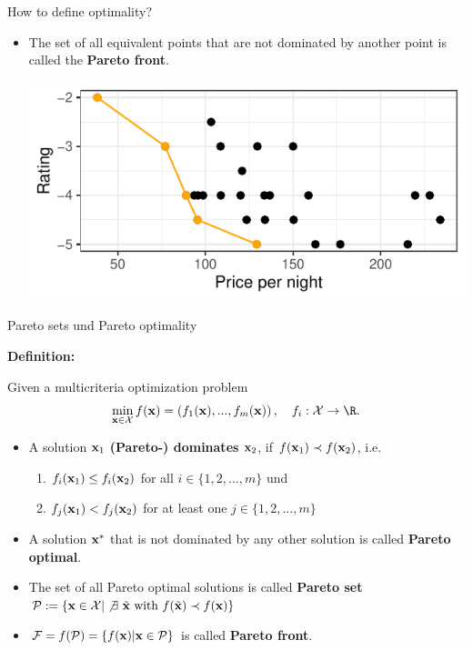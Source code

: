 \begin{frame}[allowframebreaks]{How to define optimality?}
\begin{itemize}
\item The set of all equivalent points that are not dominated by another point is called the \textbf{Pareto front}.

\vspace*{0.3cm}

\centering \includegraphics[width=\maxwidth]{images/expedia-5-1}



\end{itemize}

\end{frame}

\begin{frame}[allowframebreaks]{Pareto sets und Pareto optimality}

\textbf{Definition:}

Given a multicriteria optimization problem $$\min_{\x \in \Xspace} f(\x) = \left(f_1(\x), ..., f_m(\x)\right), \quad f_i: \Xspace \to \R.$$

\begin{itemize}
\item A solution $\mathbf{x}_1$ \textbf{(Pareto-) dominates} $\mathbf{x}_2$, if $f(\mathbf{x}_1) \prec f(\mathbf{x}_2)$, i.e.
\begin{enumerate}
\item $f_i(\mathbf{x}_1) \le f_i(\mathbf{x}_2)$ for all $i \in \{1, 2, ..., m\}$ und
\item $f_j(\mathbf{x}_1) < f_j(\mathbf{x}_2)$ for at least one $j \in \{1, 2, ..., m\}$
\end{enumerate}
\vspace*{0.1cm}
\item A solution $\mathbf{x}^*$ that is not dominated by any other solution is called \textbf{Pareto optimal}.
\vspace*{0.1cm}
\item The set of all Pareto optimal solutions is called \textbf{Pareto set} $\mathcal{P} := \{\mathbf{x} \in \mathcal{X} |\not \exists ~\tilde{\mathbf{x}} \text{ with } f(\tilde{\mathbf{x}}) \prec f(\mathbf{x})\}$
\item $\mathcal{F} = f(\mathcal{P}) = \{f(\mathbf{x}) | \mathbf{x} \in \mathcal{P}\}$ is called \textbf{Pareto front}.
\end{itemize}

\end{frame}

